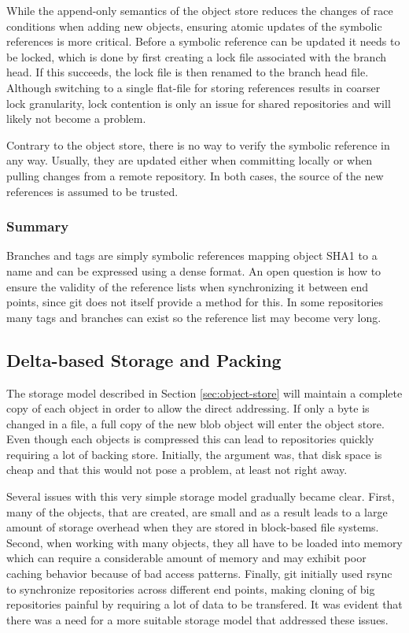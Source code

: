 While the append-only semantics of the object store reduces the
changes of race conditions when adding new objects, ensuring atomic
updates of the symbolic references is more critical. Before a symbolic
reference can be updated it needs to be locked, which is done by first
creating a lock file associated with the branch head. If this
succeeds, the lock file is then renamed to the branch head file.
Although switching to a single flat-file for storing references
results in coarser lock granularity, lock contention is only an issue
for shared repositories and will likely not become a problem.

Contrary to the object store, there is no way to verify the symbolic
reference in any way. Usually, they are updated either when committing
locally or when pulling changes from a remote repository. In
both cases, the source of the new references is assumed to be trusted.

\subsubsection*{Summary}

Branches and tags are simply symbolic references mapping object SHA1
to a name and can be expressed using a dense format. An open question
is how to ensure the validity of the reference lists when
synchronizing it between end points, since git does not itself provide
a method for this. In some repositories many tags and branches can
exist so the reference list may become very long.

\subsection{Delta-based Storage and Packing}


The storage model described in Section \ref{sec:object-store} will
maintain a complete copy of each object in order to allow the direct
addressing. If only a byte is changed in a file, a full copy of the
new blob object will enter the object store. Even though each objects
is compressed this can lead to repositories quickly requiring a lot of
backing store. Initially, the argument was, that disk space is cheap
and that this would not pose a problem, at least not right away.


Several issues with this very simple storage model gradually became
clear. First, many of the objects, that are created, are small and as
a result leads to a large amount of storage overhead when they are
stored in block-based file systems. Second, when working with
many objects, they all have to be loaded into memory which can require
a considerable amount of memory and may exhibit poor caching behavior
because of bad access patterns. Finally, git initially used rsync to
synchronize repositories across different end points, making cloning
of big repositories painful by requiring a lot of data to be
transfered. It was evident that there was a need for a more suitable
storage model that addressed these issues.

